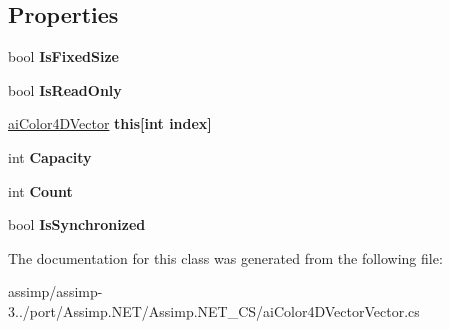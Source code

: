 \subsection*{Properties}
\begin{DoxyCompactItemize}
\item 
\hypertarget{classai_color4_d_vector_vector_a9f33d472603ce1da2fd7bec167a73ea1}{bool {\bfseries Is\+Fixed\+Size}}\label{classai_color4_d_vector_vector_a9f33d472603ce1da2fd7bec167a73ea1}

\item 
\hypertarget{classai_color4_d_vector_vector_a6f13886217bb4710408128f2a151a7b2}{bool {\bfseries Is\+Read\+Only}}\label{classai_color4_d_vector_vector_a6f13886217bb4710408128f2a151a7b2}

\item 
\hypertarget{classai_color4_d_vector_vector_abc5fcf960b4a7e49ff4306f6e355b673}{\hyperlink{classai_color4_d_vector}{ai\+Color4\+D\+Vector} {\bfseries this\mbox{[}int index\mbox{]}}}\label{classai_color4_d_vector_vector_abc5fcf960b4a7e49ff4306f6e355b673}

\item 
\hypertarget{classai_color4_d_vector_vector_ace38449a61711253d5b3fcfab04bfec8}{int {\bfseries Capacity}}\label{classai_color4_d_vector_vector_ace38449a61711253d5b3fcfab04bfec8}

\item 
\hypertarget{classai_color4_d_vector_vector_a48c0536d7c962d4367330d0d8fcec165}{int {\bfseries Count}}\label{classai_color4_d_vector_vector_a48c0536d7c962d4367330d0d8fcec165}

\item 
\hypertarget{classai_color4_d_vector_vector_ae83df9c5640f48e2c2e39642f5e044da}{bool {\bfseries Is\+Synchronized}}\label{classai_color4_d_vector_vector_ae83df9c5640f48e2c2e39642f5e044da}

\end{DoxyCompactItemize}


The documentation for this class was generated from the following file\+:\begin{DoxyCompactItemize}
\item 
assimp/assimp-\/3../port/\+Assimp.\+N\+E\+T/\+Assimp.\+N\+E\+T\+\_\+\+C\+S/ai\+Color4\+D\+Vector\+Vector.\+cs\end{DoxyCompactItemize}

